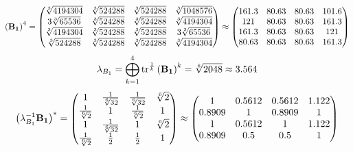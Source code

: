 \documentclass[10pt,a4paper]{article}
\begin{document}
	\[
		\left(\bold{B_1}\right)^{4} = 
		\begin{pmatrix}
			{\sqrt[3]{4194304}} {} & {\sqrt[3]{524288}} {} & {\sqrt[3]{524288}} {} & {\sqrt[3]{1048576}} {} \\
			{{3}\sqrt[3]{65536}} {} & {\sqrt[3]{524288}} {} & {\sqrt[3]{524288}} {} & {\sqrt[3]{4194304}} {} \\
			{\sqrt[3]{4194304}} {} & {\sqrt[3]{524288}} {} & {\sqrt[3]{524288}} {} & {{3}\sqrt[3]{65536}} {} \\
			{\sqrt[3]{524288}} {} & {\sqrt[3]{524288}} {} & {\sqrt[3]{524288}} {} & {\sqrt[3]{4194304}} {} \\
		\end{pmatrix}
		\approx
		\begin{pmatrix}
			161.3    & 80.63    & 80.63    & 101.6    \\
			121      & 80.63    & 80.63    & 161.3    \\
			161.3    & 80.63    & 80.63    & 121      \\
			80.63    & 80.63    & 80.63    & 161.3    \\
		\end{pmatrix}
	\]
	\[
		\lambda_{B_1} =  \bigoplus ^{4} _{k = 1} \operatorname{tr} ^{\frac 1 k} \left( \bold{B_1} \right)^k = {\sqrt[6]{2048}} {}\approx 3.564
	\]
	\[
		\left(\lambda_{B_1}^{-1}\bold{B_1}\right)^* = 
		\begin{pmatrix}
			{1} {} & \frac{1} {\sqrt[6]{32}} & \frac{1} {\sqrt[6]{32}} & {\sqrt[6]{2}} {} \\
			\frac{1} {\sqrt[6]{2}} & {1} {} & \frac{1} {\sqrt[6]{2}} & {1} {} \\
			{1} {} & \frac{1} {\sqrt[6]{32}} & {1} {} & {\sqrt[6]{2}} {} \\
			\frac{1} {\sqrt[6]{2}} & \frac{1} {{2}} & \frac{1} {{2}} & {1} {} \\
		\end{pmatrix}
		\approx
		\begin{pmatrix}
			1        & 0.5612   & 0.5612   & 1.122    \\
			0.8909   & 1        & 0.8909   & 1        \\
			1        & 0.5612   & 1        & 1.122    \\
			0.8909   & 0.5      & 0.5      & 1        \\
		\end{pmatrix}
	\]
\end{document}
